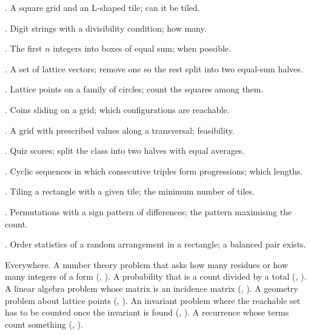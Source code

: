 \begin{ladder}
\item {}. A square grid and an L-shaped tile; can it be tiled.
\item {}. Digit strings with a divisibility condition; how many.
\item {}. The first $n$ integers into boxes of equal sum; when possible.
\item {}. A set of lattice vectors; remove one so the rest split into two equal-sum halves.
\item {}. Lattice points on a family of circles; count the squares among them.
\item {}. Coins sliding on a grid; which configurations are reachable.
\item {}. A grid with prescribed values along a transversal; feasibility.
\item {}. Quiz scores; split the class into two halves with equal averages.
\item {}. Cyclic sequences in which consecutive triples form progressions; which lengths.
\item {}. Tiling a rectangle with a given tile; the minimum number of tiles.
\item {}. Permutations with a sign pattern of differences; the pattern maximising the count.
\item {}. Order statistics of a random arrangement in a rectangle; a balanced pair exists.
\end{ladder}

\begin{hides}
Everywhere. A number theory problem that asks how many residues or how many integers of a form (, ). A probability that is a count divided by a total (, ). A linear algebra problem whose matrix is an incidence matrix (, ). A geometry problem about lattice points (, ). An invariant problem where the reachable set has to be counted once the invariant is found (, ). A recurrence whose terms count something (, ).
\end{hides}
